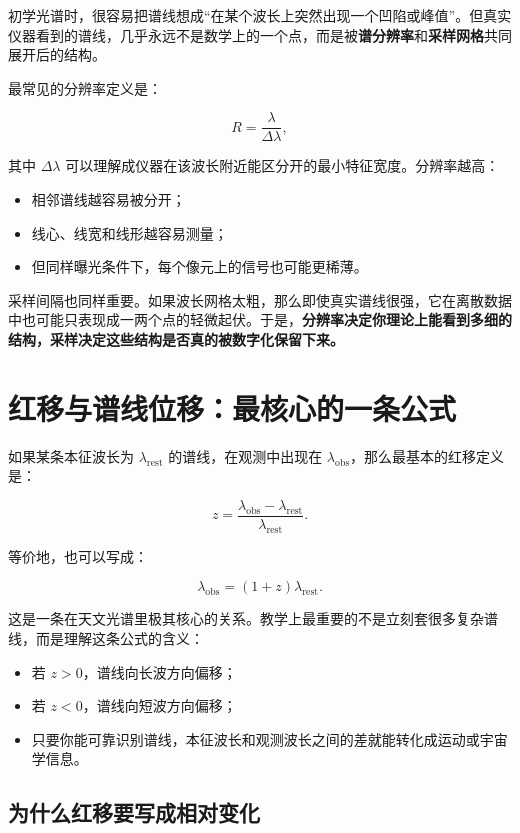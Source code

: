 初学光谱时，很容易把谱线想成“在某个波长上突然出现一个凹陷或峰值”。但真实仪器看到的谱线，几乎永远不是数学上的一个点，而是被\textbf{谱分辨率}和\textbf{采样网格}共同展开后的结构。

最常见的分辨率定义是：

\[
R = \frac{\lambda}{\Delta \lambda},
\]

其中 $\Delta \lambda$ 可以理解成仪器在该波长附近能区分开的最小特征宽度。分辨率越高：

\begin{itemize}
    \item 相邻谱线越容易被分开；
    \item 线心、线宽和线形越容易测量；
    \item 但同样曝光条件下，每个像元上的信号也可能更稀薄。
\end{itemize}

采样间隔也同样重要。如果波长网格太粗，那么即使真实谱线很强，它在离散数据中也可能只表现成一两个点的轻微起伏。于是，\textbf{分辨率决定你理论上能看到多细的结构，采样决定这些结构是否真的被数字化保留下来。}

\section{红移与谱线位移：最核心的一条公式}

如果某条本征波长为 $\lambda_{\mathrm{rest}}$ 的谱线，在观测中出现在 $\lambda_{\mathrm{obs}}$，那么最基本的红移定义是：

\[
z = \frac{\lambda_{\mathrm{obs}} - \lambda_{\mathrm{rest}}}{\lambda_{\mathrm{rest}}}.
\]

等价地，也可以写成：

\[
\lambda_{\mathrm{obs}} = (1+z)\lambda_{\mathrm{rest}}.
\]

这是一条在天文光谱里极其核心的关系。教学上最重要的不是立刻套很多复杂谱线，而是理解这条公式的含义：

\begin{itemize}
    \item 若 $z > 0$，谱线向长波方向偏移；
    \item 若 $z < 0$，谱线向短波方向偏移；
    \item 只要你能可靠识别谱线，本征波长和观测波长之间的差就能转化成运动或宇宙学信息。
\end{itemize}

\subsection{为什么红移要写成相对变化}

